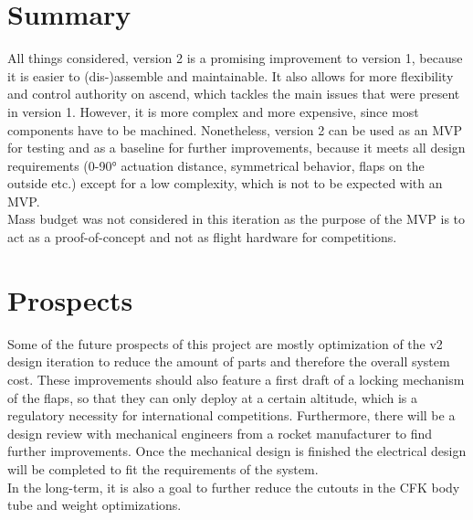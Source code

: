\documentclass[fontsize=11pt,%
twoside,%
BCOR          = 8mm, %
DIV           = 11,  %
titlepage     = off,%
index=totoc,%
xcolor        = pdftex,%
dvipsnames,%
bibliography  = totoc,%
bibliography = numbered, %
listof        = notnumbered]{scrreprt}
\begin{document}
\section{Summary}
All things considered, version 2 is a promising improvement to version 1, because it is easier to (dis-)assemble and maintainable. It also allows for more flexibility and control authority on ascend, which tackles the main issues that were present in version 1. However, it is more complex and more expensive, since most components have to be machined. Nonetheless, version 2 can be used as an MVP for testing and as a baseline for further improvements, because it meets all design requirements (0-90° actuation distance, symmetrical behavior, flaps on the outside etc.) except for a low complexity, which is not to be expected with an MVP.\\
Mass budget was not considered in this iteration as the purpose of the MVP is to act as a proof-of-concept and not as flight hardware for competitions.

\section{Prospects}
Some of the future prospects of this project are mostly optimization of the v2 design iteration to reduce the amount of parts and therefore the overall system cost. These improvements should also feature a first draft of a locking mechanism of the flaps, so that they can only deploy at a certain altitude, which is a regulatory necessity for international competitions. Furthermore, there will be a design review with mechanical engineers from a rocket manufacturer to find further improvements. Once the mechanical design is finished the electrical design will be completed to fit the requirements of the system.\\
In the long-term, it is also a goal to further reduce the cutouts in the CFK body tube and weight optimizations.












\newpage
\printbibliography %
\end{document}
